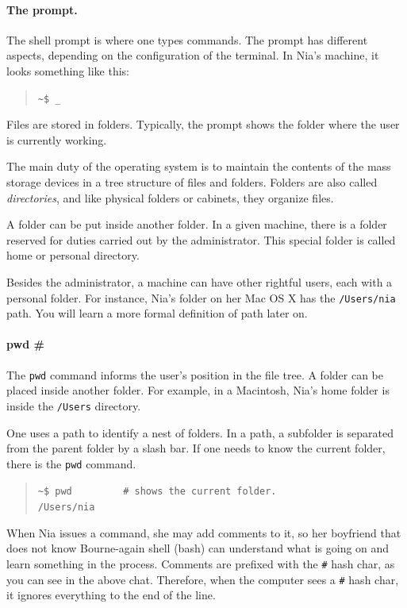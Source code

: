 \documentclass[a4paper,12pt,openany]{book}
\begin{document}
\paragraph{The prompt.} 
The shell prompt
is where one types commands. The prompt
has different aspects, depending on the
configuration of the terminal.
In Nia's machine, it looks something like this:
\begin{quote}
\verb|~$ _|
\end{quote}
Files are stored in folders. Typically, the
prompt shows the folder where the user is
currently working.

The main duty of the
operating system is to maintain the contents of
the mass storage devices in a tree structure
of files and folders.
Folders are also called {\em directories},
and like physical folders or cabinets,
they organize files.

A folder can be put inside another folder.
In a given machine, there is a folder 
reserved for duties carried out by the
administrator.
This special folder is called home
or personal directory.

Besides the administrator, a machine can
have other rightful users, each with
a personal folder. For instance, Nia's folder
on her Mac OS X has the \verb|/Users/nia|
path. You will learn a more formal
definition of path later on.


\paragraph{pwd \#} 
The \verb|pwd| command informs
the user's position in the file tree.
A folder can be placed
inside another folder.
For example, in a Macintosh, Nia's home
folder is inside the \verb|/Users| directory.

One uses a path to identify
a nest of folders. In a path, a subfolder
is separated from the parent folder
by a slash bar. If one needs to know
the current folder, there is the \verb|pwd|
command. 
\begin{quote}
\verb|~$ pwd         # shows the current folder. |\\
\verb|/Users/nia|\\
\end{quote}
When Nia issues a command, she may
add comments to it, so her boyfriend that
does not know Bourne-again shell (bash)
can understand what
is going on and learn something in
the process. Comments are prefixed
with the \verb|#| hash char, as you
can see in the above chat. Therefore,
when the computer sees a \verb|#|
hash char, it ignores everything to
the end of the line.
\end{document}
